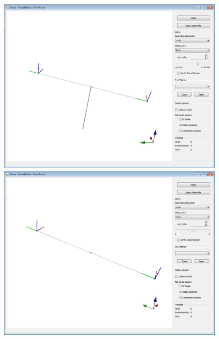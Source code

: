 \documentclass{book}
\begin{document}
 \par
 \begin{figure}[H]
 	\centering
 	\begin{minipage} {.45\linewidth}
 	  \includegraphics[width=\linewidth]{Tutorial7}
 	\end{minipage}
 	\begin{minipage} {.45\linewidth}
 	  \includegraphics[width=\linewidth]{Tutorial7b}
 	\end{minipage}
 \end{figure}
 \par
\end{document}
